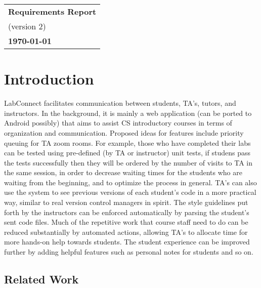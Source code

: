 \documentclass[a4paper, 12pt]{article}
\begin{document}
    \begin{table}[h!]
        \renewcommand{\arraystretch}{1.5}
        \centering
        \begin{tabular}{ |>{\centering\arraybackslash}m{15.15cm}| }
            \hline
            \Large \textbf{Requirements Report} \\
            \small (version 2) \\
            \small \textbf{\today} \\
            \hline
        \end{tabular}
    \end{table}


    \section{Introduction}

    LabConnect facilitates communication between students, TA's, tutors,
    and instructors. In the background, it is mainly a web application
    (can be ported to Android possibly) that aims to assist CS introductory
    courses in terms of organization and communication. Proposed ideas for
    features include priority queuing for TA zoom rooms. For example, those
    who have completed their labs can be tested using pre-defined (by TA or
    instructor) unit tests, if studens pass the tests successfully then they will be
    ordered by the number of visits to TA in the same session, in order to decrease
    waiting times for the students who are waiting from the beginning, and
    to optimize the process in general. TA's can also use the system to see
    previous versions of each student's code in a more practical way,
    similar to real version control managers in spirit. The style guidelines
    put forth by the instructors can be enforced automatically by parsing
    the student's sent code files. Much of the repetitive work that course
    staff need to do can be reduced substantially by automated actions,
    allowing TA's to allocate time for more hands-on help towards students.
    The student experience can be improved further by adding helpful
    features such as personal notes for students and so on.

    \subsection{Related Work}
\end{document}
